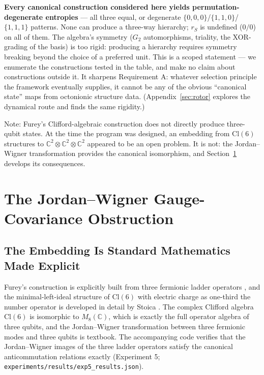 \documentclass[11pt]{article}
\newcommand{\CC}{\mathbb{C}}
\begin{document}
\textbf{Every canonical construction considered here yields permutation-degenerate entropies} --- all three equal, or degenerate $\{0,0,0\}$/$\{1,1,0\}$/$\{1,1,1\}$ patterns. None can produce a three-way hierarchy; $r_S$ is undefined ($0/0$) on all of them. The algebra's symmetry ($G_2$ automorphisms, triality, the XOR-grading of the basis) is too rigid: producing a hierarchy requires symmetry breaking beyond the choice of a preferred unit. This is a scoped statement --- we enumerate the constructions tested in the table, and make no claim about constructions outside it. It sharpens Requirement A: whatever selection principle the framework eventually supplies, it cannot be any of the obvious ``canonical state'' maps from octonionic structure data. (Appendix~\ref{sec:rotor} explores the dynamical route and finds the same rigidity.)

Note: Furey's Clifford-algebraic construction \cite{furey14, furey18} does not directly produce three-qubit states. At the time the program was designed, an embedding from $\mathrm{Cl}(6)$ structures to $\CC^2 \otimes \CC^2 \otimes \CC^2$ appeared to be an open problem. It is not: the Jordan--Wigner transformation provides the canonical isomorphism, and Section~\ref{sec:jw} develops its consequences.

\section{The Jordan--Wigner Gauge-Covariance Obstruction}
\label{sec:jw}

\subsection{The Embedding Is Standard Mathematics Made Explicit}
\label{sec:embedding}

Furey's construction is explicitly built from three fermionic ladder operators \cite{furey14, furey18}, and the minimal-left-ideal structure of $\mathrm{Cl}(6)$ with electric charge as one-third the number operator is developed in detail by Stoica \cite{stoica}. The complex Clifford algebra $\mathrm{Cl}(6)$ is isomorphic to $M_8(\CC)$, which is exactly the full operator algebra of three qubits, and the Jordan--Wigner transformation \cite{jordanwigner} between three fermionic modes and three qubits is textbook. The accompanying code verifies that the Jordan--Wigner images of the three ladder operators satisfy the canonical anticommutation relations exactly (Experiment 5; \texttt{experiments/results/exp5\_results.json}).
\end{document}
